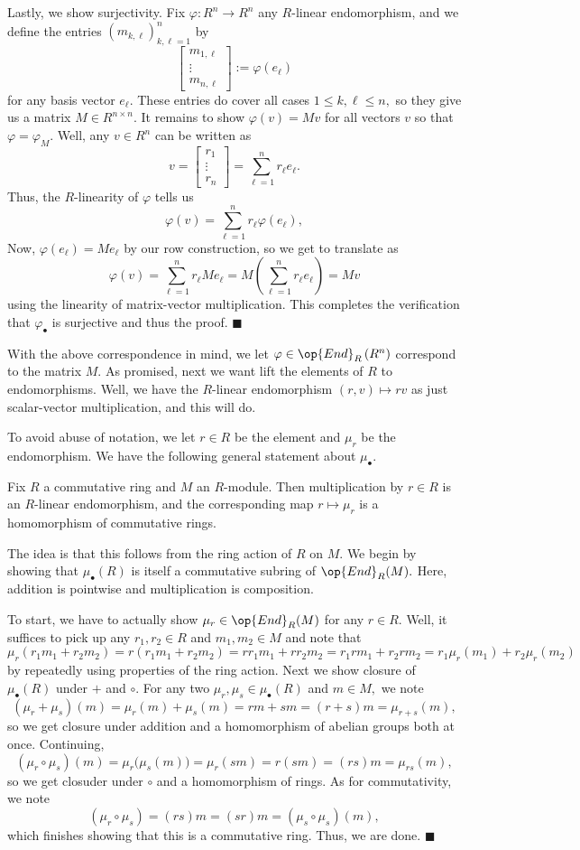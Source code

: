 Lastly, we show surjectivity. Fix $\varphi:R^n\to R^n$ any $R$-linear endomorphism, and we define the entries $(m_{k,\ell})_{k,\ell=1}^n$ by
\[\begin{bmatrix}m_{1,\ell} \\ \vdots \\ m_{n,\ell}\end{bmatrix}:=\varphi(e_\ell)\]
for any basis vector $e_\ell.$ These entries do cover all cases $1\le k,\ell\le n,$ so they give us a matrix $M\in R^{n\times n}.$ It remains to show $\varphi(v)=Mv$ for all vectors $v$ so that $\varphi=\varphi_M.$ Well, any $v\in R^n$ can be written as
\[v=\begin{bmatrix}r_1 \\ \vdots \\ r_n\end{bmatrix}=\sum_{\ell=1}^nr_\ell e_\ell.\]
Thus, the $R$-linearity of $\varphi$ tells us
\[\varphi(v)=\sum_{\ell=1}^nr_\ell\varphi(e_\ell),\]
Now, $\varphi(e_\ell)=Me_\ell$ by our row construction, so we get to translate as
\[\varphi(v)=\sum_{\ell=1}^nr_\ell Me_\ell=M\left(\sum_{\ell=1}^nr_\ell e_\ell\right)=Mv\]
using the linearity of matrix-vector multiplication. This completes the verification that $\varphi_\bullet$ is surjective and thus the proof. $\blacksquare$

With the above correspondence in mind, we let $\varphi\in\op{End}_R\left(R^n\right)$ correspond to the matrix $M.$ As promised, next we want lift the elements of $R$ to endomorphisms. Well, we have the $R$-linear endomorphism $(r,v)\mapsto rv$ as just scalar-vector multiplication, and this will do.

To avoid abuse of notation, we let $r\in R$ be the element and $\mu_r$ be the endomorphism. We have the following general statement about $\mu_\bullet.$
\begin{lemma}
    Fix $R$ a commutative ring and $M$ an $R$-module. Then multiplication by $r\in R$ is an $R$-linear endomorphism, and the corresponding map $r\mapsto\mu_r$ is a homomorphism of commutative rings.
\end{lemma}
The idea is that this follows from the ring action of $R$ on $M.$ We begin by showing that $\mu_\bullet(R)$ is itself a commutative subring of $\op{End}_R(M).$ Here, addition is pointwise and multiplication is composition.

To start, we have to actually show $\mu_r\in\op{End}_R(M)$ for any $r\in R.$ Well, it suffices to pick up any $r_1,r_2\in R$ and $m_1,m_2\in M$ and note that
\[\mu_r(r_1m_1+r_2m_2)=r(r_1m_1+r_2m_2)=rr_1m_1+rr_2m_2=r_1rm_1+r_2rm_2=r_1\mu_r(m_1)+r_2\mu_r(m_2)\]
by repeatedly using properties of the ring action. Next we show closure of $\mu_\bullet(R)$ under $+$ and $\circ.$ For any two $\mu_r,\mu_s\in\mu_\bullet(R)$ and $m\in M,$ we note
\[(\mu_r+\mu_s)(m)=\mu_r(m)+\mu_s(m)=rm+sm=(r+s)m=\mu_{r+s}(m),\]
so we get closure under addition and a homomorphism of abelian groups both at once. Continuing,
\[(\mu_r\circ\mu_s)(m)=\mu_r\big(\mu_s(m)\big)=\mu_r(sm)=r(sm)=(rs)m=\mu_{rs}(m),\]
so we get closuder under $\circ$ and a homomorphism of rings. As for commutativity, we note
\[(\mu_r\circ\mu_s)=(rs)m=(sr)m=(\mu_s\circ\mu_s)(m),\]
which finishes showing that this is a commutative ring. Thus, we are done. $\blacksquare$

